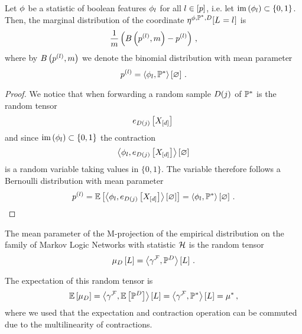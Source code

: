 \begin{lemma}
	Let $\phi$ be a statistic of boolean features $\phi_{l}$ for all $l\in[p]$, i.e. let $\mathrm{im}\left(\phi_{l}\right)\subset \{0,1\}$.
	Then, the marginal distribution of the coordinate $\eta^{\phi,\mathbb{P}^*,D}[L_{}=l_{}]$ is 
		\[\frac{1}{m}\left(B\left(p^{(l)},m\right)- p^{(l)}\right)  \, , \] 
	where by $B\left(p^{(l)},m\right)$ we denote the binomial distribution with mean parameter
		\[ p^{(l)} = \left\langle \phi_{l},\mathbb{P}^*\right\rangle \left[ \varnothing \right] \, . \]
\end{lemma}
\begin{proof}
	We notice that when forwarding a random sample $D(j)$ of $\mathbb{P}^*$ is the random tensor
		\[ e_{D(j)}\left[X_{[d]}\right] \, \]
	and since $\mathrm{im}\left(\phi_{l}\right)\subset \{0,1\}$ the contraction
		\[ \left\langle \phi_{l}, e_{D(j)}\left[X_{[d]}\right]\right\rangle \left[ \varnothing \right] \]
	is a random variable taking values in $\{0,1\}$.
	The variable therefore follows a Bernoulli distribution with mean parameter
		\[ p^{(l)} = \mathbb{E}\left[\left\langle \phi_{l}, e_{D(j)}\left[X_{[d]}\right]\right\rangle \left[ \varnothing \right]\right] = \left\langle \phi_{l}, \mathbb{P}^*\right\rangle \left[ \varnothing \right]  \, . \]
\end{proof}


The mean parameter of the M-projection of the empirical distribution on the family of Markov Logic Networks with statistic $\mathcal{H}$ is the random tensor
\begin{align*}
	\mu_{D}\left[L\right] =  \left\langle \gamma^{\mathcal{F}},\mathbb{P}^{D}\right\rangle \left[ L \right] \, . 
\end{align*}

The expectation of this random tensor is
\begin{align*}
	\mathbb{E}\left[\mu_{D}\right] 
	=  \left\langle \gamma^{\mathcal{F}},\mathbb{E}\left[\mathbb{P}^{D}\right]\right\rangle \left[ L \right] 
	=  \left\langle \gamma^{\mathcal{F}},\mathbb{P}^*\right\rangle \left[ L \right] 
	=  \mu^* \, ,  
\end{align*}
where we used that the expectation and contraction operation can be commuted due to the multilinearity of contractions.





